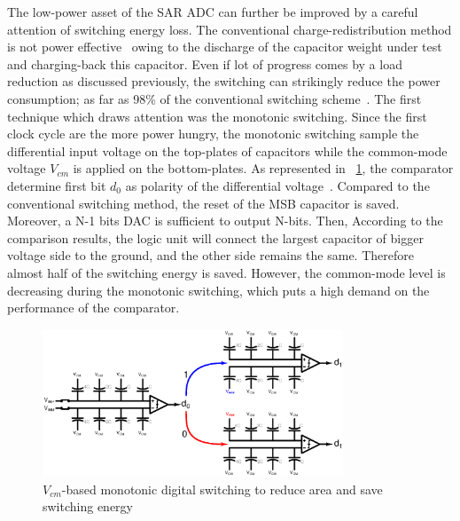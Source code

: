 	\label{sec:sar-switching}
The low-power asset of the SAR ADC can further be improved by a careful attention of switching energy loss. The conventional charge-redistribution method is not power effective~\cite{Ginsburg2005} owing to the discharge of the capacitor weight under test and charging-back this capacitor. Even if lot of progress comes by a load reduction as discussed previously, the switching can strikingly reduce the power consumption; as far as 98\% of the conventional switching scheme~\cite{Zhu2013,Xie2014,Li2016}.
The first technique which draws attention was the monotonic switching. Since the first clock cycle are the more power hungry, the monotonic switching sample the differential input voltage on the top-plates of capacitors while the common-mode voltage \(V_{cm}\) is applied on the bottom-plates. As represented in \figurename~\ref{fig:sar_vcm_monotonic}, the comparator determine first bit \(d_0\) as polarity of the differential voltage~\cite{Ginsburg2005}. Compared to the conventional switching method, the reset of the MSB capacitor is saved. Moreover, a N-1 bits DAC is sufficient to output N-bits. Then, According to the comparison results, the logic unit will connect the largest capacitor of bigger voltage side to the ground, and the other side remains the same. Therefore almost half of the switching energy is saved. However, the common-mode level is decreasing during the monotonic switching, which puts a high demand on the performance of the comparator.

\begin{figure}[htp]
	\centering
	\includegraphics[width=0.8\textwidth]{sar_vcm_monotonic.ps}
	\caption{\(V_{cm}\)-based monotonic digital switching to reduce area and save switching energy}
	\label{fig:sar_vcm_monotonic}
\end{figure}

